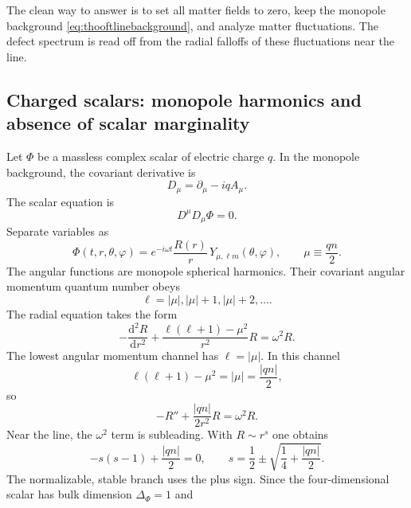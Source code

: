 \documentclass[11pt]{article}
\newcommand{\dd}{\mathrm{d}}
\newcommand{\defeq}{\equiv}
\begin{document}
The clean way to answer is to set all matter fields to zero, keep the monopole background \eqref{eq:thooftlinebackground}, and analyze matter fluctuations.  The defect spectrum is read off from the radial falloffs of these fluctuations near the line.

\subsection{Charged scalars: monopole harmonics and absence of scalar marginality}

Let $\Phi$ be a massless complex scalar of electric charge $q$.  In the monopole background, the covariant derivative is
\begin{equation}
  D_\mu=\partial_\mu-iqA_\mu .
\end{equation}
The scalar equation is
\begin{equation}
  D^\mu D_\mu \Phi=0 .
\end{equation}
Separate variables as
\begin{equation}
  \Phi(t,r,\theta,\varphi)=e^{-i\omega t}\frac{R(r)}{r}\,Y_{\mu,\ell m}(\theta,\varphi),
  \qquad
  \mu\defeq \frac{qn}{2} .
\end{equation}
The angular functions are monopole spherical harmonics.  Their covariant angular momentum quantum number obeys
\begin{equation}
  \ell=|\mu|, |\mu|+1, |\mu|+2,\dots .
  \label{eq:monopoleharmonicell}
\end{equation}
The radial equation takes the form
\begin{equation}
  -\frac{\dd^2 R}{\dd r^2}
  +\frac{\ell(\ell+1)-\mu^2}{r^2}R
  =\omega^2 R .
  \label{eq:scalarMonopoleRadialGeneral}
\end{equation}
The lowest angular momentum channel has $\ell=|\mu|$.  In this channel
\begin{equation}
  \ell(\ell+1)-\mu^2=|\mu|=\frac{|qn|}{2},
\end{equation}
so
\begin{equation}
  -R''+\frac{|qn|}{2r^2}R=\omega^2R .
  \label{eq:scalarMonopoleRadialLowest}
\end{equation}
Near the line, the $\omega^2$ term is subleading.  With $R\sim r^s$ one obtains
\begin{equation}
  -s(s-1)+\frac{|qn|}{2}=0,
  \qquad
  s=\frac12\pm\sqrt{\frac14+\frac{|qn|}{2}} .
\end{equation}
The normalizable, stable branch uses the plus sign.  Since the four-dimensional scalar has bulk dimension $\Delta_\Phi=1$ and
\end{document}
